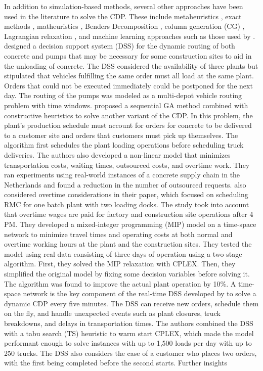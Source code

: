 \documentclass{article}
\begin{document}
In addition to simulation-based methods, several other approaches have been used in the literature to solve the CDP. These include metaheuristics \citep{faria2006distributed, misir2011selection, maghrebi2016sequential, yang2022concrete}, exact methods \citep{yan2007optimal, asbach2009analysis, kinable2014concrete}, matheuristics \citep{schmid2009hybrid, schmid2010hybridization}, Benders Decomposition \citep{maghrebi2014benders}, column generation (CG) \citep{maghrebi2014solving, maghrebi2016column}, Lagrangian relaxation \citep{narayanan2015using}, and machine learning approaches such as those used by \cite{graham2006modeling, maghrebi2014exploring, maghrebi2016matching}. \cite{matsatsinis2004towards} designed a decision support system (DSS) for the dynamic routing of both concrete and pumps that may be necessary for some construction sites to aid in the unloading of concrete. The DSS considered the availability of three plants but stipulated that vehicles fulfilling the same order must all load at the same plant. Orders that could not be executed immediately could be postponed for the next day. The routing of the pumps was modeled as a multi-depot vehicle routing problem with time windows. \cite{naso2007genetic} proposed a sequential GA method combined with constructive heuristics to solve another variant of the CDP. In this problem, the plant's production schedule must account for orders for concrete to be delivered to a customer site and orders that customers must pick up themselves. The algorithm first schedules the plant loading operations before scheduling truck deliveries. The authors also developed a non-linear model that minimizes transportation costs, waiting times, outsourced costs, and overtime work. They ran experiments using real-world instances of a concrete supply chain in the Netherlands and found a reduction in the number of outsourced requests. \cite{yan2007optimal} also considered overtime considerations in their paper, which focused on scheduling RMC for one batch plant with two loading docks. The study took into account that overtime wages are paid for factory and construction site operations after 4 PM. They developed a mixed-integer programming (MIP) model on a time-space network to minimize travel times and operating costs at both normal and overtime working hours at the plant and the construction sites. They tested the model using real data consisting of three days of operation using a two-stage algorithm. First, they solved the MIP relaxation with CPLEX. Then, they simplified the original model by fixing some decision variables before solving it. The algorithm was found to improve the actual plant operation by 10\%. A time-space network is the key component of the real-time DSS developed by \cite{durbin2008or} to solve a dynamic CDP every five minutes. The DSS can receive new orders, schedule them on the fly, and handle unexpected events such as plant closures, truck breakdowns, and delays in transportation times. The authors combined the DSS with a tabu search (TS) heuristic to warm start CPLEX, which made the model performant enough to solve instances with up to 1,500 loads per day with up to 250 trucks. The DSS also considers the case of a customer who places two orders, with the first being completed before the second starts. Further insights 
\end{document}

